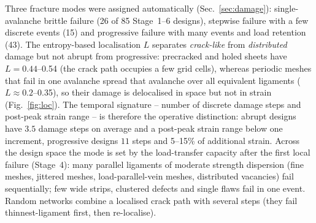 Three fracture modes were assigned automatically (Sec.~\ref{sec:damage}): single-avalanche brittle failure (26 of 85 Stage~1--6 designs), stepwise failure with a few discrete events (15) and progressive failure with many events and load retention (43). The entropy-based localisation $L$ separates \emph{crack-like} from \emph{distributed} damage but not abrupt from progressive: precracked and holed sheets have $L=0.44$--0.54 (the crack path occupies a few grid cells), whereas periodic meshes that fail in one avalanche spread that avalanche over all equivalent ligaments ($L\approx0.2$--0.35), so their damage is delocalised in space but not in strain (Fig.~\ref{fig:loc}). The temporal signature -- number of discrete damage steps and post-peak strain range -- is therefore the operative distinction: abrupt designs have $3.5$ damage steps on average and a post-peak strain range below one increment, progressive designs $11$ steps and 5--15\% of additional strain. Across the design space the mode is set by the load-transfer capacity after the first local failure (Stage~4): many parallel ligaments of moderate strength dispersion (fine meshes, jittered meshes, load-parallel-vein meshes, distributed vacancies) fail sequentially; few wide strips, clustered defects and single flaws fail in one event. Random networks combine a localised crack path with several steps (they fail thinnest-ligament first, then re-localise).

